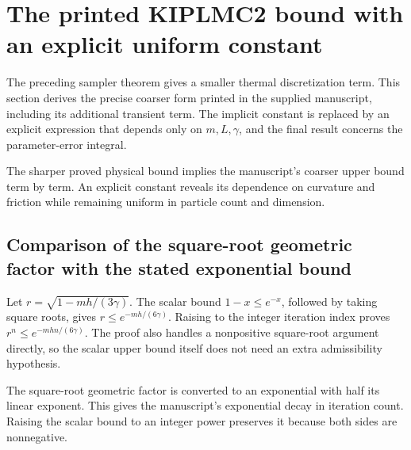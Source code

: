 \documentclass[11pt,a4paper]{report}
\begin{document}
\section{\texorpdfstring{The printed KIPLMC2 bound with an explicit uniform constant}{The printed KIPLMC2 bound with an explicit uniform constant}}
\label{proof-module-KIPLMC-OBABOPaperRate-lean}


The preceding sampler theorem gives a smaller thermal discretization term. This section derives the precise coarser form printed in the supplied manuscript, including its additional transient term. The implicit constant is replaced by an explicit expression that depends only on \(m,L,\gamma\), and the final result concerns the parameter-error integral.



The sharper proved physical bound implies the manuscript’s coarser upper bound term by term. An explicit constant reveals its dependence on curvature and friction while remaining uniform in particle count and dimension.

\subsection{\texorpdfstring{Comparison of the square-root geometric factor with the stated exponential bound}{Comparison of the square-root geometric factor with the stated exponential bound}}
\label{report-step-KIPLMC-OBABOPaperRate-lean-1}


Let \(r=\sqrt{1-mh/(3\gamma)}\). The scalar bound \(1-x\le e^{-x}\), followed by taking square roots, gives \(r\le e^{-mh/(6\gamma)}\). Raising to the integer iteration index proves \(r^n\le e^{-mhn/(6\gamma)}\). The proof also handles a nonpositive square-root argument directly, so the scalar upper bound itself does not need an extra admissibility hypothesis.



The square-root geometric factor is converted to an exponential with half its linear exponent. This gives the manuscript’s exponential decay in iteration count. Raising the scalar bound to an integer power preserves it because both sides are nonnegative.
\end{document}
